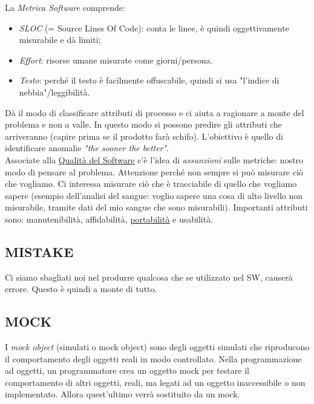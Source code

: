 		La \textit{Metrica Software} comprende:
			\begin{itemize}
				\item \textit{SLOC} (= Source Lines Of Code): conta le linee, è quindi oggettivamente misurabile e dà limiti;
				\item \textit{Effort}: risorse umane misurate come giorni/persona.
				\item \textit{Testo}: perché il testo è facilmente offuscabile, quindi si usa "l'indice di nebbia"/leggibilità. 
			\end{itemize}
		Dà il modo di classificare attributi di processo e ci aiuta a ragionare a monte del problema e non a valle. In questo modo si possono predire gli attributi che arriveranno (capire prima se il prodotto farà schifo). L'obiettivo è quello di identificare anomalie \textit{"the sooner the better"}. \\
		Associate alla \underline{\hyperref[qualita]{Qualità del Software}} c'è l'idea di \textit{assunzioni} sulle metriche: nostro modo di pensare al problema. Attenzione perché non sempre si può misurare ciò che vogliamo. Ci interessa misurare ciò che è tracciabile di quello che vogliamo sapere (esempio dell'analisi del sangue: voglio sapere una cosa di alto livello non misurabile, tramite dati del mio sangue che sono misurabili). Importanti attributi sono: manutenibilità, affidabilità, \underline{\hyperref[portabilita]{portabilità}} e usabilità.
		
		\subsection{MISTAKE}		\label{mistake}
		Ci siamo sbagliati noi nel produrre qualcosa che se utilizzato  nel SW, causerà errore. Questo è quindi a monte di tutto.		 
		
		\subsection{MOCK}		\label{mock}
		I \textit{mock object} (simulati o mock object) sono degli oggetti simulati che riproducono il comportamento degli oggetti reali in modo controllato. Nella programmazione ad oggetti, un programmatore crea un oggetto mock per testare il comportamento di altri oggetti, reali, ma legati ad un oggetto inaccessibile o non implementato. Allora quest'ultimo verrà sostituito da un mock.
		
